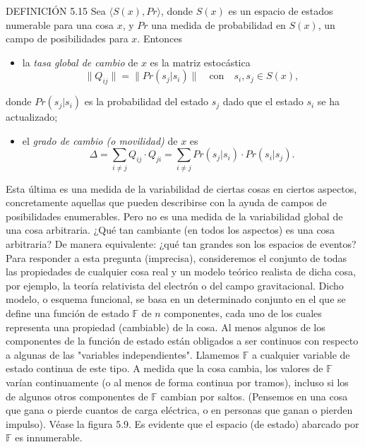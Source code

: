 \begin{justifying}
    \noindent DEFINICIÓN 5.15 Sea $\langle S(x), Pr \rangle$, donde $S(x)$ es un espacio de estados numerable
    para una cosa $x$, y $Pr$ una medida de probabilidad en $S(x)$, un campo de posibilidades
    para $x$. Entonces 
    \begin{itemize}
        \item[(i)] la \textit{tasa global de cambio} de $x$ es la matriz estocástica
        \[
            \lVert Q_{ij}\rVert=\lVert Pr(s_j|s_i)\rVert \quad \text{con} \quad s_i,s_j\in S(x),
        \]
    \end{itemize}
    donde $Pr(s_j|s_i)$ es la probabilidad del estado $s_j$ dado que el estado $s_i$ se ha
    actualizado;
    \begin{itemize}   
        \item[(ii)] el \textit{grado de cambio (o movilidad)} de $x$ es
        \scriptsize
        \[
            \Delta = \sum_{i \ne j} Q_{ij} \cdot Q_{ji} = \sum_{i \ne j} Pr(s_j|s_i) \cdot Pr(s_i|s_j).
        \]
    \end{itemize} 

    Esta última es una medida de la variabilidad de ciertas cosas en ciertos aspectos, concretamente aquellas que pueden describirse con la 
    ayuda de campos de posibilidades enumerables. Pero no es una medida de la variabilidad global de una cosa arbitraria. ¿Qué tan cambiante 
    (en todos los aspectos) es una cosa arbitraria? De manera equivalente: ¿qué tan grandes son los espacios de eventos? Para responder a esta 
    pregunta (imprecisa), consideremos el conjunto de todas las propiedades de cualquier cosa real y un modelo teórico realista de dicha cosa, 
    por ejemplo, la teoría relativista del electrón o del campo gravitacional. Dicho modelo, o esquema funcional, se basa en un determinado conjunto 
    en el que se define una función de estado $\mathbb{F}$ de $n$ componentes, cada uno de los cuales representa una propiedad (cambiable) de la cosa. Al menos 
    algunos de los componentes de la función de estado están obligados a ser continuos con respecto a algunas de las "variables independientes". 
    Llamemos $\mathbb{F}$ a cualquier variable de estado continua de este tipo. A medida que la cosa cambia, los valores de $\mathbb{F}$ varían continuamente (o al menos de 
    forma continua por tramos), incluso si los de algunos otros componentes de $\mathbb{F}$ cambian por saltos. (Pensemos en una cosa que gana o pierde cuantos 
    de carga eléctrica, o en personas que ganan o pierden impulso). Véase la figura 5.9. Es evidente que el espacio (de estado) abarcado por $\mathbb{F}$ es innumerable.


\end{justifying}
